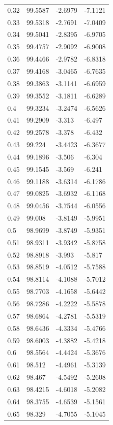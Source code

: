 \begin{tabular}{llll}
0.32 & 99.5587 & -2.6979 & -7.1121 \\
0.33 & 99.5318 & -2.7691 & -7.0409 \\
0.34 & 99.5041 & -2.8395 & -6.9705 \\
0.35 & 99.4757 & -2.9092 & -6.9008 \\
0.36 & 99.4466 & -2.9782 & -6.8318 \\
0.37 & 99.4168 & -3.0465 & -6.7635 \\
0.38 & 99.3863 & -3.1141 & -6.6959 \\
0.39 & 99.3552 & -3.1811 & -6.6289 \\
0.4 & 99.3234 & -3.2474 & -6.5626 \\
0.41 & 99.2909 & -3.313 & -6.497 \\
0.42 & 99.2578 & -3.378 & -6.432 \\
0.43 & 99.224 & -3.4423 & -6.3677 \\
0.44 & 99.1896 & -3.506 & -6.304 \\
0.45 & 99.1545 & -3.569 & -6.241 \\
0.46 & 99.1188 & -3.6314 & -6.1786 \\
0.47 & 99.0825 & -3.6932 & -6.1168 \\
0.48 & 99.0456 & -3.7544 & -6.0556 \\
0.49 & 99.008 & -3.8149 & -5.9951 \\
0.5 & 98.9699 & -3.8749 & -5.9351 \\
0.51 & 98.9311 & -3.9342 & -5.8758 \\
0.52 & 98.8918 & -3.993 & -5.817 \\
0.53 & 98.8519 & -4.0512 & -5.7588 \\
0.54 & 98.8114 & -4.1088 & -5.7012 \\
0.55 & 98.7703 & -4.1658 & -5.6442 \\
0.56 & 98.7286 & -4.2222 & -5.5878 \\
0.57 & 98.6864 & -4.2781 & -5.5319 \\
0.58 & 98.6436 & -4.3334 & -5.4766 \\
0.59 & 98.6003 & -4.3882 & -5.4218 \\
0.6 & 98.5564 & -4.4424 & -5.3676 \\
0.61 & 98.512 & -4.4961 & -5.3139 \\
0.62 & 98.467 & -4.5492 & -5.2608 \\
0.63 & 98.4215 & -4.6018 & -5.2082 \\
0.64 & 98.3755 & -4.6539 & -5.1561 \\
0.65 & 98.329 & -4.7055 & -5.1045 \\

\end{tabular}
